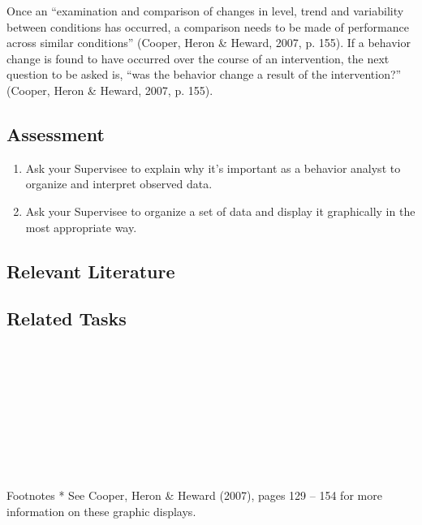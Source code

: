 Once an ``examination and comparison of changes in level, trend and variability between conditions has occurred, a comparison needs to be made of performance across similar conditions'' (Cooper, Heron \& Heward, 2007, p. 155). If a behavior change is found to have occurred over the course of an intervention, the next question to be asked is, ``was the behavior change a result of the intervention?'' (Cooper, Heron \& Heward, 2007, p. 155).

\subsection{Assessment}
\begin{enumerate}
\item Ask your Supervisee to explain why it's important as a behavior analyst to organize and interpret observed data. 
\item Ask your Supervisee to organize a set of data and display it graphically in the most appropriate way. 
\end{enumerate}
%
\subsection{Relevant Literature}
\begin{refsection}
\nocite{test,alang2017police,clayton2018black}
\printbibliography[heading=none]
\end{refsection}
%
%
\subsection{Related Tasks}
\fouraTen{}\\
\fouraEleven{}\\
\fourbFour{}\\
\fourbFive{}\\
\fourbSix{}\\
\fourbSeven{}\\
\fourbEight{}\\
\fourbNine{}\\
\fourjFifteen{}\\
%
Footnotes
* See Cooper, Heron \& Heward (2007), pages 129 – 154 for more information on these graphic displays.
%
%
%
%
%
%
%
